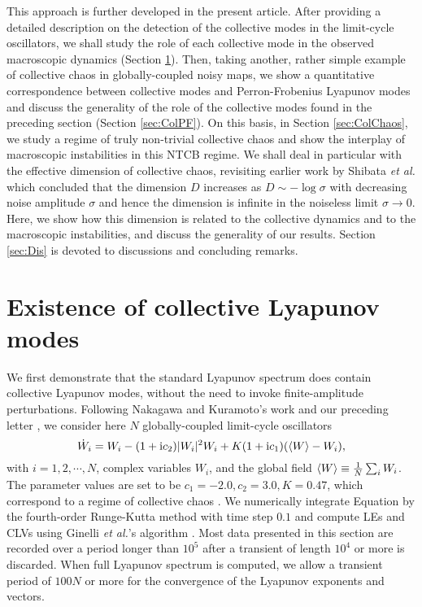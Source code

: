 \documentclass[12pt]{iopart}
\begin{document}
This approach is further developed in the present article.
After providing a detailed description on the detection
 of the collective modes in the limit-cycle oscillators,
 we shall study the role of each collective mode
 in the observed macroscopic dynamics (Section \ref{sec:Col}).
Then, taking another, rather simple example of collective chaos
 in globally-coupled noisy maps,
 we show a quantitative correspondence between
 collective modes and Perron-Frobenius Lyapunov modes
 and discuss the generality of the role of the collective modes
 found in the preceding section (Section \ref{sec:ColPF}).
On this basis, in Section \ref{sec:ColChaos}, we study
 a regime of truly non-trivial collective chaos
 and show the interplay of macroscopic instabilities in this NTCB regime.
We shall deal in particular with the effective dimension of collective chaos,
 revisiting earlier work by Shibata \textit{et al.} \cite{Shibata.etal-PRL1999}
 which concluded that the dimension $D$ increases as $D \sim -\log\sigma$
 with decreasing noise amplitude $\sigma$ and hence
 the dimension is infinite in the noiseless limit $\sigma\to 0$.
Here, we show how this dimension is related to the collective dynamics
 and to the macroscopic instabilities, and discuss the generality of our results.
Section \ref{sec:Dis} is devoted to discussions and concluding remarks.


\section{Existence of collective Lyapunov modes}  \label{sec:Col}

We first demonstrate that the standard Lyapunov spectrum does contain
 collective Lyapunov modes,
 without the need to invoke finite-amplitude perturbations.
Following
 Nakagawa and Kuramoto's work
 \cite{Nakagawa.Kuramoto-PTP1993,Nakagawa.Kuramoto-PD1995} and
 our preceding letter \cite{Takeuchi.etal-PRL2009},
 we consider here $N$ globally-coupled limit-cycle oscillators
\begin{equation}
 \dot{W}_i = W_i - (1+\mathrm{i}c_2)|W_i|^2 W_i + K (1+\mathrm{i}c_1) (\langle W \rangle - W_i),  \label{eq:GLDef}
\end{equation}
 with $i=1,2,\cdots, N$, complex variables $W_i$,
 and the global field $\langle W \rangle \equiv \frac{1}{N}\sum_i W_i$.
The parameter values are set to be $c_1 = -2.0, c_2 = 3.0, K = 0.47$,
 which correspond to a regime of collective chaos \cite{Nakagawa.Kuramoto-PTP1993,Nakagawa.Kuramoto-PD1995,Takeuchi.etal-PRL2009}.
We numerically integrate Equation  by the fourth-order
 Runge-Kutta method with time step $0.1$
 and compute LEs and CLVs using Ginelli \textit{et al.}'s algorithm 
 \cite{Ginelli.etal-PRL2007,Ginelli.etal-JPA2012}.
Most data presented in this section are recorded
 over a period longer than $10^5$
 after a transient of length $10^4$ or more is discarded.
When full Lyapunov spectrum is computed,
 we allow a transient period of $100N$ or more
 for the convergence of the Lyapunov exponents and vectors.
\end{document}
